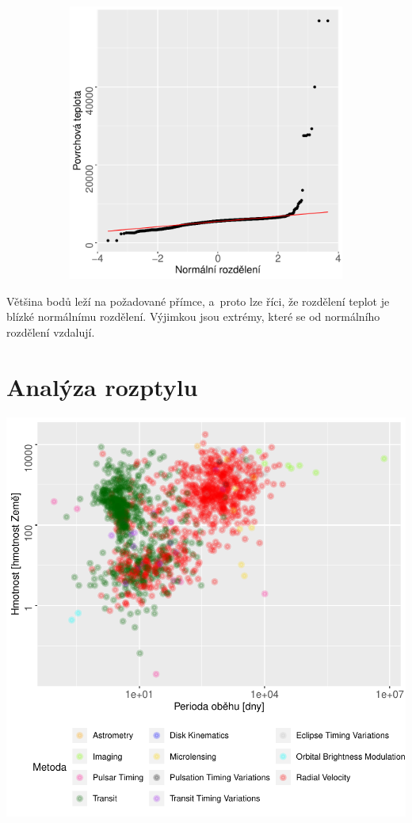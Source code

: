 \documentclass[a4paper,12pt]{article}
\begin{document}
\begin{figure}[!htb]
  \centering
  \begin{subfigure}[b]{0.7\textwidth}
\includegraphics{exoplanety-028}
  \end{subfigure}
\end{figure}

Většina bodů leží na požadované přímce, a~proto lze říci, že rozdělení teplot je blízké normálnímu rozdělení. Výjimkou jsou extrémy, které se od normálního rozdělení vzdalují.

\section{Analýza rozptylu}

\begin{center}
\includegraphics{exoplanety-029}
\end{center}
\end{document}
